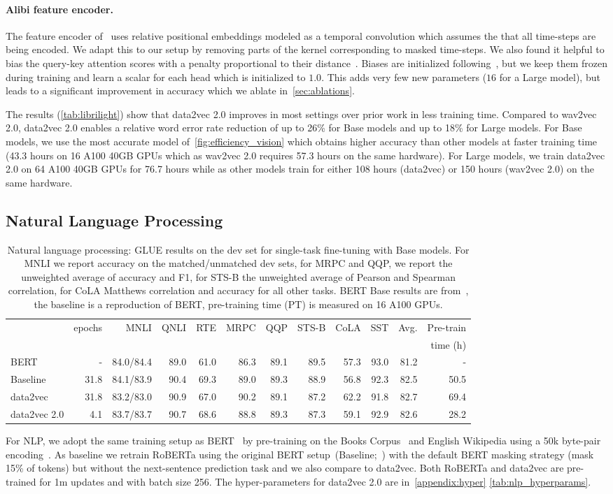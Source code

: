 \documentclass[nohyperref]{article}
\theoremstyle{plain}
\theoremstyle{definition}
\theoremstyle{remark}
\newcommand{\name}{data2vec 2.0}
\newcommand{\insertGLUEtable}{
\begin{table*}[h!]
\centering
\caption{Natural language processing: GLUE results on the dev set for single-task fine-tuning with Base models.
For MNLI we report accuracy on the matched/unmatched dev sets, for MRPC and QQP, we report the unweighted average of accuracy and F1, for STS-B the unweighted average of Pearson and Spearman correlation, for CoLA Matthews correlation and accuracy for all other tasks.
BERT Base results are from~\citet{wu2020clear}, the baseline is a reproduction of BERT, pre-training time (PT) is measured on 16 A100 GPUs.
\label{tab:glue}
} 
\vspace{0.075in}
\begin{tabular}{lrrrrrrrrrrr}
\toprule
& epochs & MNLI & QNLI & RTE & MRPC & QQP & STS-B & CoLA & SST & Avg. & Pre-train \\
& & & & & & & & & & & time (h) \\
\midrule
BERT & - & 84.0/84.4 & 89.0 & 61.0 & 86.3 & 89.1 & 89.5 & 57.3 & 93.0 & 81.2 & - \\
Baseline & 31.8 & 84.1/83.9 & 90.4 & 69.3 & 89.0 & 89.3 & 88.9 & 56.8 & 92.3 & 82.5 & 50.5 \\ 
data2vec & 31.8 & 83.2/83.0 & 90.9 & 67.0 & 90.2 & 89.1 & 87.2 & 62.2 & 91.8 & 82.7 & 69.4 \\
\name{} & 4.1 & 83.7/83.7 & 90.7 & 68.6 & 88.8 & 89.3 & 87.3 & 59.1 & 92.9 & 82.6 & 28.2 \\
\bottomrule
\end{tabular}
\end{table*}
}
\begin{document}
\paragraph{Alibi feature encoder.}
The feature encoder of~\citet{baevski2020wav} uses relative positional embeddings modeled as a temporal convolution which assumes the that all time-steps are being encoded. 
We adapt this to our setup by removing parts of the kernel corresponding to masked time-steps.
We also found it helpful to bias the query-key attention scores with a penalty proportional to their distance~\citep{press2021alibi}.
Biases are initialized following~\citet{press2021alibi}, but we keep them frozen during training and learn a scalar for each head which is initialized to $1.0$. 
This adds very few new parameters ($16$ for a Large model), but leads to a significant improvement in accuracy which we ablate in~\textsection\ref{sec:ablations}.

The results (\autoref{tab:librilight}) show that \name{} improves in most settings over prior work in less training time. 
Compared to wav2vec 2.0, \name{} enables a relative word error rate reduction of up to 26\% for Base models and up to 18\% for Large models.
For Base models, we use the most accurate model of~\autoref{fig:efficiency_vision} which obtains higher accuracy than other models at faster training time (43.3 hours on 16 A100 40GB GPUs which as wav2vec 2.0 requires 57.3 hours on the same hardware).
For Large models, we train \name{} on 64 A100 40GB GPUs for 76.7 hours while as other models train for either 108 hours (data2vec) or 150 hours (wav2vec 2.0) on the same hardware.

\subsection{Natural Language Processing}
\label{sec:nlp}

\insertGLUEtable

For NLP, we adopt the same training setup as BERT~\citep{devlin2018bert} by pre-training on the Books Corpus~\citep{zhu2015books} and English Wikipedia using a 50k byte-pair encoding~\citep{sennrich2016bpe,devlin2018bert,liu2019roberta}.
As baseline we retrain RoBERTa using the original BERT setup~(Baseline;~\citealt{liu2019roberta}) with the default BERT masking strategy (mask 15\% of tokens) but without the next-sentence prediction task and we also compare to data2vec. 
Both RoBERTa and data2vec are pre-trained for 1m updates and with batch size 256.
The hyper-parameters for \name{} are in~\autoref{appendix:hyper} \autoref{tab:nlp_hyperparams}.
\end{document}
